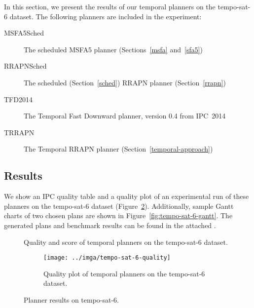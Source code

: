 In this section, we present the results of our temporal planners on the tempo-sat-6 dataset. The following planners are included in the experiment:
\begin{description}
\item[MSFA5Sched] The scheduled MSFA5 planner (Sections~\ref{msfa} and~\ref{sfa5})
\item[RRAPNSched] The scheduled (Section~\ref{sched}) RRAPN planner (Section~\ref{rrapn})
\item[TFD2014] The Temporal Fast Downward planner, version 0.4 from IPC~2014 \citep[Preferring Preferred Operators in Temporal Fast Downward]{Vallati2015}
\item[TRRAPN] The Temporal RRAPN planner (Section~\ref{temporal-approach})
\end{description}

\subsection{Results}\label{temporal-results}

We show an IPC quality table and a quality plot of an experimental run of these planners on the tempo-sat-6 dataset (Figure~\ref{fig:tempo-sat-6-results}).
Additionally, sample Gantt charts \citep{Gantt1910} of two chosen plans are shown in Figure~\ref{fig:tempo-sat-6-gantt}.
The generated plans and benchmark results can be found in the attached .

\begin{figure}[tbp]
\centering
\begin{subtable}{\textwidth}
\centering
\scriptsize
\setlength{\tabcolsep}{4.8pt}
\renewcommand{\footnotesize}{\scriptsize}

\caption{Quality and score of temporal planners on the tempo-sat-6 dataset.}
\label{tab:tempo-sat-6-ipc-scores}
\end{subtable}

\vspace{0.5cm}
\begin{subfigure}{\textwidth}
\centering
\texttt{[image: ../imga/tempo-sat-6-quality]}
\caption{Quality plot of temporal planners on the tempo-sat-6 dataset.}
\label{fig:tempo-sat-6-quality}
\end{subfigure}
\caption{Planner results on tempo-sat-6.}
\label{fig:tempo-sat-6-results}
\end{figure}

